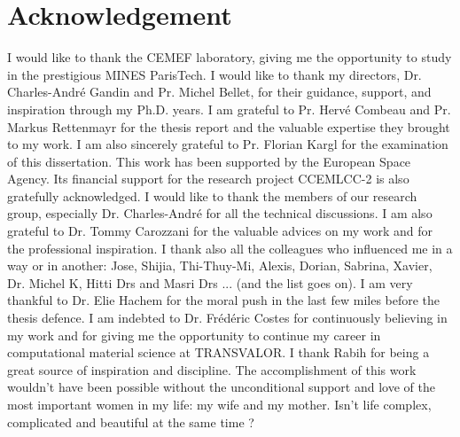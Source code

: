 \cleardoublepage
\section*{Acknowledgement}

I would like to thank the CEMEF laboratory, giving me the opportunity to study in the prestigious MINES ParisTech.
\newline
\newline
I would like to thank my directors, Dr. Charles-André Gandin and Pr. Michel Bellet, for their
guidance, support, and inspiration through my Ph.D. years.
I am grateful to Pr. Hervé Combeau and Pr. Markus Rettenmayr for the thesis report 
and the valuable expertise they brought to my work. I am also sincerely grateful to Pr. Florian Kargl for the examination of this dissertation.
This work has been supported by the European Space Agency. Its financial support for the research project CCEMLCC-2 is also gratefully acknowledged.
\newline
\newline
I would like to thank the members of our research group, especially Dr. Charles-André for all the technical discussions. 
I am also grateful to Dr. Tommy Carozzani for the valuable advices on my work and for the professional inspiration.
I thank also all the colleagues who influenced me in a way or in another: Jose, Shijia, Thi-Thuy-Mi, Alexis, Dorian, Sabrina, Xavier, Dr. Michel K, Hitti Drs and Masri Drs ... (and the list goes on).\newline
I am very thankful to Dr. Elie Hachem for the moral push in the last few miles before the thesis defence.
I am indebted to Dr. Frédéric Costes for continuously believing in my work and for giving me the opportunity
to continue my career in computational material science at TRANSVALOR.
\newline
\newline
I thank Rabih for being a great source of inspiration and discipline. The accomplishment of this work wouldn't have been possible without the unconditional support and love of the most important women in my life: my wife and my mother. 
\newline
\newline
Isn't life complex, complicated and beautiful at the same time ?